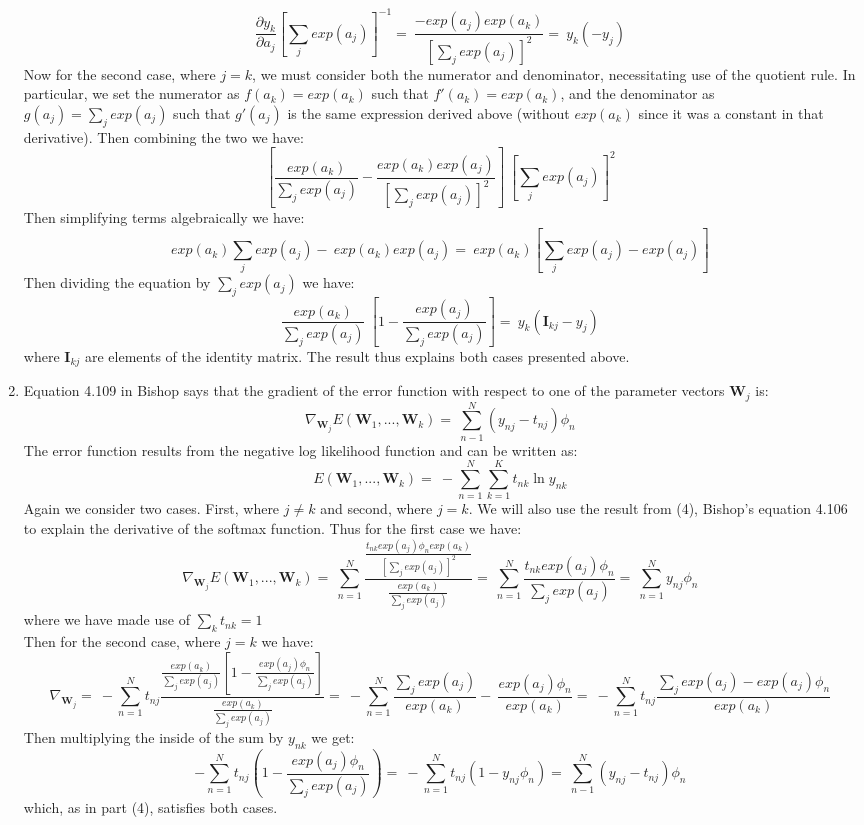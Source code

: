 \documentclass[submit]{harvardml}
\begin{document}
\begin{enumerate}
		\[
		\frac{\partial y_k}{\partial a_j} [\sum_j exp(a_j)]^{-1} = \
		\frac{-exp(a_j)exp(a_k)}{[\sum_j exp(a_j)]^2} = \
		y_k (-y_j) \
		\]
	Now for the second case, where $j=k$, we must consider both the numerator and denominator, necessitating use of the quotient rule. In particular, we set the numerator as $f(a_k)=exp(a_k)$ such that $f'(a_k)=exp(a_k)$, and the denominator as $g(a_j)=\sum_j exp(a_j)$ such that $g'(a_j)$ is the same expression derived above (without $exp(a_k)$ since it was a constant in that derivative). Then combining the two we have:
		\[
		[\frac{exp(a_k)}{\sum_j exp(a_j)} - \frac{exp(a_k)exp(a_j)}{[\sum_j exp(a_j)]^2}] \
		[\sum_j exp(a_j)]^2 \
		\]
	Then simplifying terms algebraically we have:
		\[
		exp(a_k)\sum_j exp(a_j) - \
		exp(a_k)exp(a_j) = \
		exp(a_k)[\sum_j exp(a_j)-exp(a_j)] \		
		\]
	Then dividing the equation by $\sum_j exp(a_j)$ we have:
		\[
		\frac{exp(a_k)}{\sum_j exp(a_j)} \
		[1-\frac{exp(a_j)}{\sum_j exp(a_j)} ] = \
		y_k (\mathbf{I}_{kj} - y_j) \
		\]
	where $\mathbf{I}_{kj}$ are elements of the identity matrix. The result thus explains both cases presented above.
	\item Equation 4.109 in Bishop says that the gradient of the error function with respect to one of the parameter vectors $\mathbf{W}_j$ is:
		\[
		\nabla_{\mathbf{W}_j} E(\mathbf{W}_1,...,\mathbf{W}_k) = \
		\sum_{n-1}^{N} (y_{nj}-t_{nj})\phi_n \
		\]
	The error function results from the negative log likelihood function and can be written as:
		\[
		E(\mathbf{W}_1,...,\mathbf{W}_k) = \
		-\sum_{n=1}^{N}\sum_{k=1}^{K} t_{nk}\ln y_{nk} \
		\]
	Again we consider two cases. First, where $j \neq k$ and second, where $j = k$. We will also use the result from (4), Bishop's equation 4.106 to explain the derivative of the softmax function. Thus for the first case we have:
		\[
		\nabla_{\mathbf{W}_j} E(\mathbf{W}_1,...,\mathbf{W}_k) = \
		\sum_{n=1}^{N}\frac{\frac{t_{nk}exp(a_j)\phi_n exp(a_k)}{[\sum_j exp(a_j)]^2}}{\frac{exp(a_k)}{\sum_j exp(a_j)}}  = \
		\sum_{n=1}^{N}\frac{t_{nk}exp(a_j)\phi_n}{\sum_j exp(a_j)} = \
		\sum_{n=1}^{N}y_{nj}\phi_n \
		\]
	where we have made use of $\sum_k t_{nk}=1$ \\
	Then for the second case, where $j=k$ we have:
		\[
		\nabla_{\mathbf{W}_j} = \
		-\sum_{n=1}^{N}t_{nj}\frac{\frac{exp(a_k)}{\sum_j exp(a_j)}
		[1-\frac{exp(a_j)\phi_n}{\sum_j exp(a_j)} ]}{\frac{exp(a_k)}{\sum_j exp(a_j)}} = \
		-\sum_{n=1}^{N} \frac{\sum_j exp(a_j)}{exp(a_k)} - \
		\frac{exp(a_j)\phi_n}{exp(a_k)} = \
		-\sum_{n=1}^{N}t_{nj}\frac{\sum_j exp(a_j) - exp(a_j)\phi_n} {exp(a_k)} \
		\]
	Then multiplying the inside of the sum by $y_{nk}$ we get:
		\[
		-\sum_{n=1}^{N}t_{nj}(1-\frac{exp(a_j)\phi_n}{\sum_j exp(a_j)}) = \
		-\sum_{n=1}^{N}t_{nj}(1-y_{nj}\phi_n)  = \
		\sum_{n-1}^{N} (y_{nj}-t_{nj})\phi_n \
		\]
	which, as in part (4), satisfies both cases.
\end{enumerate}
\end{document}
